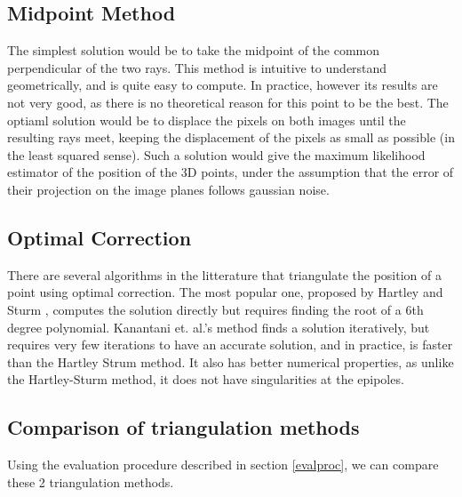 \subsection{Midpoint Method}
The simplest solution would be to take the midpoint of the common perpendicular of the two rays. This method is intuitive to understand geometrically, and is quite easy to compute. In practice, however its results are not very good, as there is no theoretical reason for this point to be the best. The optiaml solution would be to displace the pixels on both images until the resulting rays meet, keeping the displacement of the pixels as small as possible (in the least squared sense). Such a solution would give the maximum likelihood estimator of the position of the 3D points, under the assumption that the error of their projection on the image planes follows gaussian noise.

\subsection{Optimal Correction}
There are several algorithms in the litterature that triangulate the position of a point using optimal correction. The most popular one, proposed by Hartley and Sturm \cite{hartleysturm}, computes the solution directly but requires finding the root of a 6th degree polynomial. Kanantani et. al.'s method \cite{kanatani} finds a solution iteratively, but requires very few iterations to have an accurate solution, and in practice, is faster than the Hartley Strum method. It also has better numerical properties, as unlike the Hartley-Sturm method, it does not have singularities at the epipoles.

\subsection{Comparison of triangulation methods}
Using the evaluation procedure described in section \ref{evalproc}, we can compare these 2 triangulation methods.

